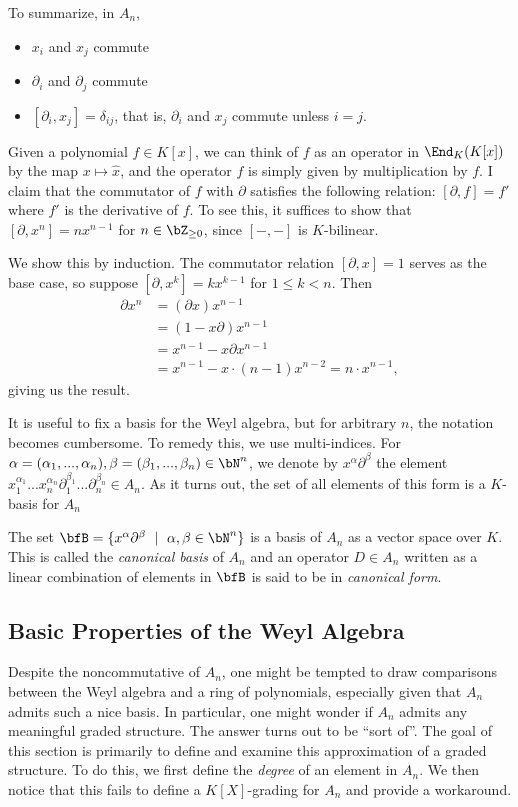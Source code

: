 \noindent To summarize, in $A_n$,
\begin{itemize}
	\item $x_i$ and $x_j$ commute
	\item $\partial_i$ and $\partial_j$ commute
	\item $[\partial_i,x_j] = \delta_{ij}$, that is, $\partial_i$ and $x_j$ commute unless $i = j$.
\end{itemize}
\begin{example}\label{example:commutator-as-derivative-one-dim}
    Given a polynomial $f \in K[x]$, we can think of $f$ as an operator in $\End_K(K[x])$ by the map $x \mapsto \hat{x}$, and the operator $f$ is simply given by multiplication by $f$. I claim that the commutator of $f$ with $\partial$ satisfies the following relation: $[\partial, f] = f'$ where $f'$ is the derivative of $f$. To see this, it suffices to show that $[\partial, x^n] = nx^{n-1}$ for $n \in \bZ_{\geq 0}$, since $[-,-]$ is $K$-bilinear.

	We show this by induction. The commutator relation $[\partial,x] = 1$ serves as the base case, so suppose $[\partial, x^k] = kx^{k-1}$ for $1\leq k < n$. Then
	\begin{align*}
		\partial x^n
		&= (\partial x)x^{n-1} \\
		&= (1 - x\partial)x^{n-1} \\
		&= x^{n-1} - x\partial x^{n-1} \\
		&= x^{n-1} - x\cdot (n-1) x^{n-2} = n\cdot x^{n-1},
	\end{align*}
	giving us the result.
\end{example}
It is useful to fix a basis for the Weyl algebra, but for arbitrary $n$, the notation becomes cumbersome. To remedy this, we use multi-indices. For $\alpha = (\alpha_1,...,\alpha_n), \beta = (\beta_1,...,\beta_n)\in \bN^n$, we denote by $x^\alpha\partial^\beta$ the element $x_1^{\alpha_1}...x_n^{\alpha_n}\partial_1^{\beta_1}...\partial_n^{\beta_n} \in A_n$. As it turns out, the set of all elements of this form is a $K$-basis for $A_n$
\begin{prop}\label{prop:canonical-basis}
	The set $\bfB = \{x^\alpha\partial^\beta ~ \mid ~ \alpha,\beta\in \bN^n\}$ is a basis of $A_n$ as a vector space over $K$. This is called the \emph{canonical basis} of $A_n$ and an operator $D \in A_n$ written as a linear combination of elements in $\bfB$ is said to be in \emph{canonical form}.
\end{prop}

\subsection{Basic Properties of the Weyl Algebra}
Despite the noncommutative of $A_n$, one might be tempted to draw comparisons between the Weyl algebra and a ring of polynomials, especially given that $A_n$ admits such a nice basis. In particular, one might wonder if $A_n$ admits any meaningful graded structure. The answer turns out to be ``sort of''. The goal of this section is primarily to define and examine this approximation of a graded structure. To do this, we first define the \emph{degree} of an element in $A_n$. We then notice that this fails to define a $K[X]$-grading for $A_n$ and provide a workaround.

